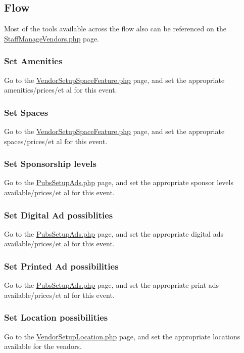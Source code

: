 \documentclass[captions=tablesignature]{scrartcl}
\begin{document}
\subsection{Flow}
\label{sec-3-2}
Most of the tools available across the flow also can be referenced
on the \href{../webpages/StaffManageVendors.php}{StaffManageVendors.php} page.
\subsubsection{Set Amenities}
\label{sec-3-2-1}
Go to the \href{../webpages/VendorSetupSpaceFeature.php}{VendorSetupSpaceFeature.php} page, and set the
appropriate amenities/prices/et al for this event.

\subsubsection{Set Spaces}
\label{sec-3-2-2}
Go to the \href{../webpages/VendorSetupSpaceFeature.php}{VendorSetupSpaceFeature.php} page, and set the
appropriate spaces/prices/et al for this event.

\subsubsection{Set Sponsorship levels}
\label{sec-3-2-3}
Go to the \href{../webpages/PubsSetupAds.php}{PubsSetupAds.php} page, and set the
appropriate sponsor levels available/prices/et al for this event.

\subsubsection{Set Digital Ad possiblities}
\label{sec-3-2-4}
Go to the \href{../webpages/PubsSetupAds.php}{PubsSetupAds.php} page, and set the
appropriate digital ads available/prices/et al for this event.

\subsubsection{Set Printed Ad possibilities}
\label{sec-3-2-5}
Go to the \href{../webpages/PubsSetupAds.php}{PubsSetupAds.php} page, and set the
appropriate print ads available/prices/et al for this event.

\subsubsection{Set Location possibilities}
\label{sec-3-2-6}
Go to the \href{../webpages/VendorSetupLocation.php}{VendorSetupLocation.php} page, and set the appropriate
locations available for the vendors.
\end{document}
